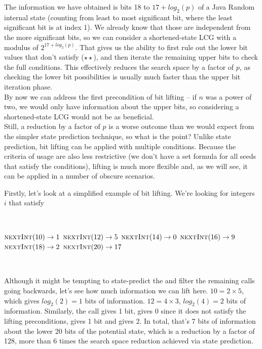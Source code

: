 \documentclass{article}
\begin{document}
The information we have obtained is bits 18 to $17 + log_2(p)$ of a Java Random internal state (counting from least to most significant bit, where the least significant bit is at index 1). We already know that those are independent from the more significant bits, so we can consider a shortened-state LCG with a modulus of $2^{17+log_2(p)}$. That gives us the ability to first rule out the lower bit values that don’t satisfy ($\star \star$), and then iterate the remaining upper bits to check the full conditions. This effectively reduces the search space by a factor of $p$, as checking the lower bit possibilities is usually much faster than the upper bit iteration phase. \\
By now we can address the first precondition of bit lifting -- if $n$ was a power of two, we would only have information about the upper bits, so considering a shortened-state LCG would not be as beneficial. \\
Still, a reduction by a factor of $p$ is a worse outcome than we would expect from the simpler state prediction technique, so what is the point? Unlike state prediction, bit lifting can be applied with multiple conditions. Because the criteria of usage are also less restrictive (we don’t have a set formula for all seeds that satisfy the conditions), lifting is much more flexible and, as we will see, it can be applied in a number of obscure scenarios. 

Firstly, let’s look at a simplified example of bit lifting. We’re looking for integers $i$ that satisfy

\
\begin{algorithmic}
\State {}
\State $\Call{nextInt}{10} \to 1$
\State $\Call{nextInt}{12} \to 5$
\State $\Call{nextInt}{14} \to 0$
\State $\Call{nextInt}{16} \to 9$
\State $\Call{nextInt}{18} \to 2$
\State $\Call{nextInt}{20} \to 17$
\end{algorithmic}
\ \

Although it might be tempting to state-predict the  and filter the remaining calls going backwards, let’s see how much information we can lift here. $10 = 2 \times 5$, which gives $log_2(2) = 1$ bits of information. $12 = 4 \times 3$, $log_2(4) = 2$ bits of information. Similarly, the  call gives 1 bit,  gives 0 since it does not satisfy the lifting preconditions,  gives 1 bit and  gives 2. In total, that’s 7 bits of information about the lower 20 bits of the potential state, which is a reduction by a factor of 128, more than 6 times the search space reduction achieved via state prediction. %
\end{document}
